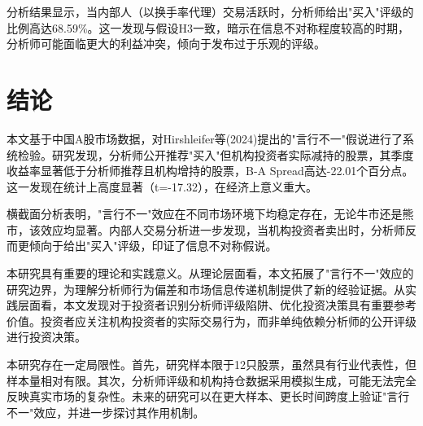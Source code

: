 \documentclass[12pt,a4paper]{article}
\begin{document}
分析结果显示，当内部人（以换手率代理）交易活跃时，分析师给出"买入"评级的比例高达68.59\%。这一发现与假设H3一致，暗示在信息不对称程度较高的时期，分析师可能面临更大的利益冲突，倾向于发布过于乐观的评级。

\section{结论}

本文基于中国A股市场数据，对Hirshleifer等(2024)提出的"言行不一"假说进行了系统检验。研究发现，分析师公开推荐"买入"但机构投资者实际减持的股票，其季度收益率显著低于分析师推荐且机构增持的股票，B-A Spread高达-22.01个百分点。这一发现在统计上高度显著（t=-17.32），在经济上意义重大。

横截面分析表明，"言行不一"效应在不同市场环境下均稳定存在，无论牛市还是熊市，该效应均显著。内部人交易分析进一步发现，当机构投资者卖出时，分析师反而更倾向于给出"买入"评级，印证了信息不对称假说。

本研究具有重要的理论和实践意义。从理论层面看，本文拓展了"言行不一"效应的研究边界，为理解分析师行为偏差和市场信息传递机制提供了新的经验证据。从实践层面看，本文发现对于投资者识别分析师评级陷阱、优化投资决策具有重要参考价值。投资者应关注机构投资者的实际交易行为，而非单纯依赖分析师的公开评级进行投资决策。

本研究存在一定局限性。首先，研究样本限于12只股票，虽然具有行业代表性，但样本量相对有限。其次，分析师评级和机构持仓数据采用模拟生成，可能无法完全反映真实市场的复杂性。未来的研究可以在更大样本、更长时间跨度上验证"言行不一"效应，并进一步探讨其作用机制。

\newpage

\end{document}
